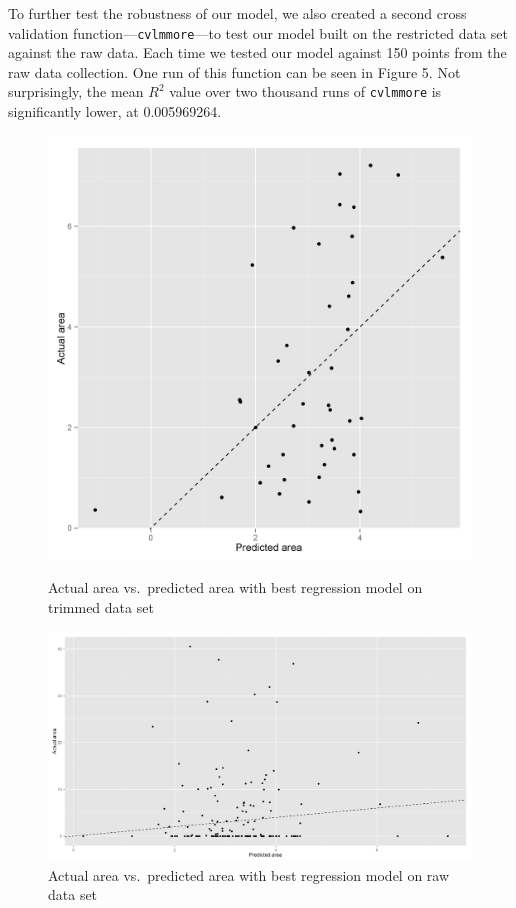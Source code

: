 \documentclass{article}
\begin{document}
To further test the robustness of our model, we also created a second cross
validation function---\verb=cvlmmore=---to test our model built on the
restricted data set against the raw data. Each time we tested our model against
150 points from the raw data collection. One run of this function can be seen
in Figure 5. Not surprisingly, the mean $R^2$ value over two thousand runs of
\verb=cvlmmore= is significantly lower, at 0.005969264.
\begin{figure}
  \begin{minipage}[b]{0.45\linewidth}
  \centering
  \includegraphics[width=\textwidth]{figures/goodfiresowndat.png}
  \caption{Actual area vs.\ predicted area with best regression model on
  trimmed data set}
\end{minipage}
\hspace{0.5cm}
  \begin{minipage}[b]{0.45\linewidth}
  \centering
  \includegraphics[width=\textwidth]{figures/goodfiresalldat.png}
  \caption{Actual area vs.\ predicted area with best regression model on raw
  data set}
\end{minipage}
\end{figure}
\end{document}

